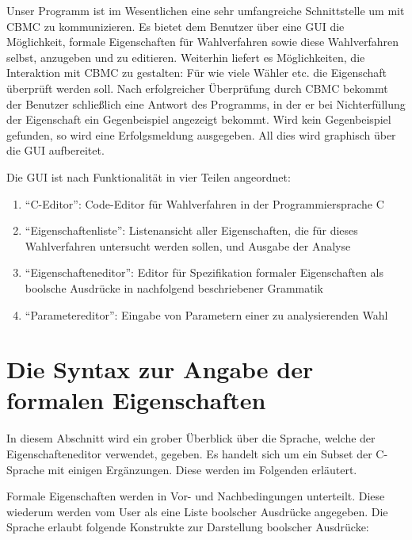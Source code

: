\documentclass[a4paper]{scrreprt}
\begin{document}
Unser Programm ist im Wesentlichen eine sehr umfangreiche Schnittstelle um mit \ac{CBMC} zu kommunizieren. Es bietet dem \gls{Benutzer} über eine \ac{GUI} die Möglichkeit, formale Eigenschaften für Wahlverfahren sowie diese Wahlverfahren selbst, anzugeben und zu editieren. Weiterhin liefert es Möglichkeiten, die Interaktion mit \ac{CBMC} zu gestalten: Für wie viele Wähler etc. die Eigenschaft überprüft werden soll. Nach erfolgreicher Überprüfung durch \ac{CBMC} bekommt der \gls{Benutzer} schließlich eine Antwort des Programms, in der er bei Nichterfüllung der Eigenschaft ein Gegenbeispiel angezeigt bekommt. Wird kein Gegenbeispiel gefunden, so wird eine Erfolgsmeldung ausgegeben. All dies wird graphisch über die \ac{GUI} aufbereitet.

Die \ac{GUI} ist nach Funktionalität in vier Teilen angeordnet:
\begin{enumerate}
\item "`C-Editor"': Code-Editor für Wahlverfahren in der Programmiersprache C
\item "`Eigenschaftenliste"': Listenansicht aller Eigenschaften, die für dieses Wahlverfahren untersucht werden sollen, und Ausgabe der Analyse
\item "`Eigenschafteneditor"': Editor für Spezifikation formaler Eigenschaften als boolsche Ausdrücke in nachfolgend beschriebener Grammatik
\item "`Parametereditor"': Eingabe von Parametern einer zu analysierenden Wahl
\end{enumerate}

\section{Die Syntax zur Angabe der formalen Eigenschaften} \label{Sprache-für-formale-Eigenschaften}
In diesem Abschnitt wird ein grober Überblick über die Sprache, welche der Eigenschafteneditor verwendet, gegeben. Es handelt sich um ein \gls{Subset} der C-Sprache mit einigen Ergänzungen. Diese werden im Folgenden erläutert. 

Formale Eigenschaften werden in Vor- und Nachbedingungen unterteilt. Diese wiederum werden vom User als eine Liste boolscher Ausdrücke angegeben. Die Sprache erlaubt folgende Konstrukte zur Darstellung boolscher Ausdrücke:
\end{document}
